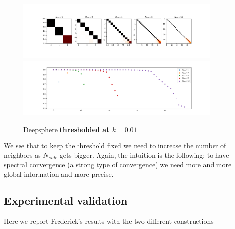 \begin{figure}[h]
	\label{fig:DeepSphere_thresholded}
	\caption{Deepsphere \textbf{thresholded at $k=0.01$}}
	\centering
	\includegraphics[width=0.9\textwidth]{../codes/02.HeatKernelGraphLaplacian/HEALPix/06_figures/deepsphere_thresholded.png}	
	\includegraphics[width=0.9\textwidth]{../codes/02.HeatKernelGraphLaplacian/HEALPix/06_figures/deepsphere_thresholded_diagonal.png}	
\end{figure}

We see that to keep the threshold fixed we need to increase the number of neighbors as $N_{side}$ gets bigger. Again, the intuition is the following: to have spectral convergence (a strong type of convergence) we need more and more global information and more precise. 
\subsection{Experimental validation}
Here we report Frederick's results with the two different constructions
